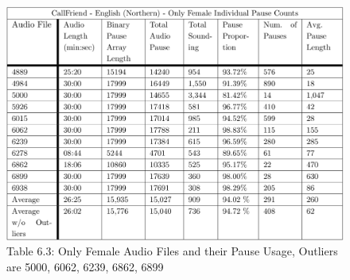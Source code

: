 \begin{figure}[h!]
	\begin{center}
		\includegraphics[scale=0.4]{src/main-matter/results/experiment-sex/pause-analysis/female-pause-table}
		\caption{Table 6.3: Only Female Audio Files and their Pause Usage, Outliers are 5000, 6062, 6239, 6862, 6899}
		\label{female-10bins}
	\end{center}
\end{figure}
